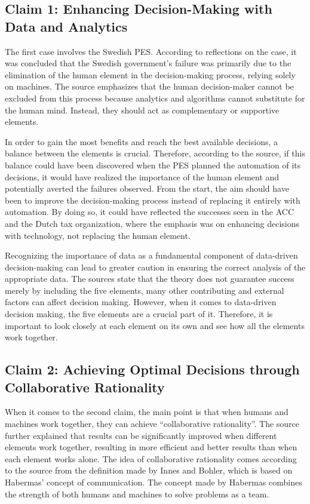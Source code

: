 \subsection{Claim 1: Enhancing Decision-Making with Data and Analytics}
The first case involves the Swedish PES. According to reflections on the case, it was concluded that the Swedish government's failure was primarily due to the elimination of the human element in the decision-making process, relying solely on machines. The source emphasizes that the human decision-maker cannot be excluded from this process because analytics and algorithms cannot substitute for the human mind. Instead, they should act as complementary or supportive elements.

In order to gain the most benefits and reach the best available decisions, a balance between the elements is crucial. Therefore, according to the source, if this balance could have been discovered when the PES planned the automation of its decisions, it would have realized the importance of the human element and potentially averted the failures observed. From the start, the aim should have been to improve the decision-making process instead of replacing it entirely with automation. By doing so, it could have reflected the successes seen in the ACC and the Dutch tax organization, where the emphasis was on enhancing decisions with technology, not replacing the human element.

Recognizing the importance of data as a fundamental component of data-driven decision-making can lead to greater caution in ensuring the correct analysis of the appropriate data.
The sources state that the theory does not guarantee success merely by including the five elements, many other contributing and external factors can affect decision making. However, when it comes to data-driven decision making, the five elements are a crucial part of it. Therefore, it is important to look closely at each element on its own and see how all the elements work together. 

\subsection{Claim 2: Achieving Optimal Decisions through Collaborative Rationality}
When it comes to the second claim, the main point is that when humans and machines work together, they can achieve “collaborative rationality”. The source further explained that results can be significantly improved when different elements work together, resulting in more efficient and better results than when each element works alone. The idea of collaborative rationality comes according to the source from the definition made by Innes and Bohler, which is based on Habermas’ concept of communication. The concept made by Habermas combines the strength of both humans and machines to solve problems as a team. 

